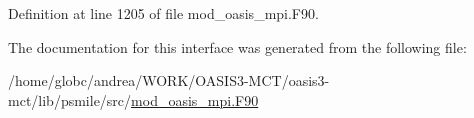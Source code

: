 Definition at line 1205 of file mod\+\_\+oasis\+\_\+mpi.\+F90.



The documentation for this interface was generated from the following file\+:\begin{DoxyCompactItemize}
\item 
/home/globc/andrea/\+W\+O\+R\+K/\+O\+A\+S\+I\+S3-\/\+M\+C\+T/oasis3-\/mct/lib/psmile/src/\hyperlink{mod__oasis__mpi_8_f90}{mod\+\_\+oasis\+\_\+mpi.\+F90}\end{DoxyCompactItemize}
